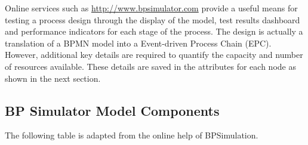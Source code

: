 \documentclass[]{book}
\begin{document}
Online services such as \url{http://www.bpsimulator.com} provide a useful means for testing a process design through the display of the model, test results dashboard and performance indicators for each stage of the process. The design is actually a translation of a BPMN model into a Event-driven Process Chain (EPC). However, additional key details are required to quantify the capacity and number of resources available. These details are saved in the attributes for each node as shown in the next section.

\hypertarget{bp-simulator-model-components}{%
\subsection{BP Simulator Model Components}\label{bp-simulator-model-components}}

The following table is adapted from the online help of BPSimulation. \citep{BPSSimulator2018}
\end{document}
